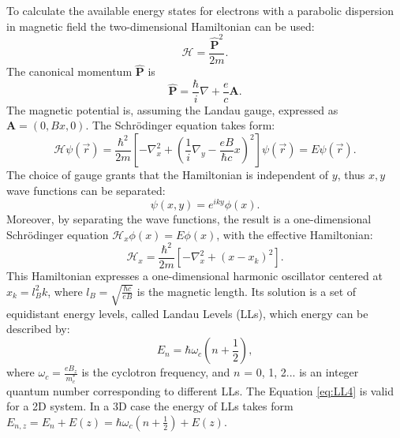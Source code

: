 \documentclass[titlepage,a4paper]{book}
\begin{document}
To calculate the available energy states for electrons with a parabolic dispersion in magnetic field the two-dimensional Hamiltonian can be used:
\begin{equation}
\label{eq:LL0}
\mathcal{H} = \frac{\hat{\mathbf{P}}^2}{2m}.  
\end{equation}
The canonical momentum $\mathbf{\hat{P}}$ is 
\begin{equation}
\label{eq:LL1}
\hat{\mathbf{P}} = \frac{\hbar}{i}\nabla + \frac{e}{c}\mathbf{A}.  
\end{equation}
The magnetic potential is, assuming the Landau gauge, expressed as $\mathbf{A} = (0, Bx, 0)$. The Schrödinger equation takes form:
\begin{equation}
\label{eq:LL2}
\mathcal{H}\psi(\vec{r}) = \frac{\hbar^2}{2m} \left[ -\nabla_x^2 + \left( \frac{1}{i}\nabla_y - \frac{eB}{\hbar c}x \right)^2 \right] \psi(\vec{r}) = E\psi(\vec{r}).
\end{equation}
The choice of gauge grants that the Hamiltonian is independent of $y$, thus $x, y$ wave functions can be separated:
\begin{equation}
\label{eq:LL2.5}
\psi (x,y) = e^{iky}\phi (x). 
\end{equation}
Moreover, by separating the wave functions, the result is a one-dimensional Schrödinger equation $\mathcal{H}_x \phi(x) = E \phi(x)$, with the effective Hamiltonian:
\begin{equation}
\label{eq:LL3}
\mathcal{H}_x = \frac{\hbar^2}{2m} \left[ -\nabla_x^2 +(x-x_k)^2 \right].
\end{equation}
This Hamiltonian expresses a one-dimensional harmonic oscillator centered at $x_k = l_B^2 k$, where $l_B = \sqrt{\frac{\hbar c}{eB}}$ is the magnetic length. Its solution is a set of equidistant energy levels, called Landau Levels (LLs), which energy can be described by:
\begin{equation}
\label{eq:LL4}
E_n = \hbar\omega_c\left( n+\frac{1}{2} \right),
\end{equation}
where $\omega_c = \frac{eB_z}{m_c^*}$ is the cyclotron frequency, and $n$ = 0, 1, 2... is an integer quantum number corresponding to different LLs. The Equation \ref{eq:LL4} is valid for a 2D system. In a 3D case the energy of LLs takes form $E_{n,z} = E_n + E(z) = \hbar\omega_c\left( n+\frac{1}{2} \right)+ E(z)$.
\end{document}
